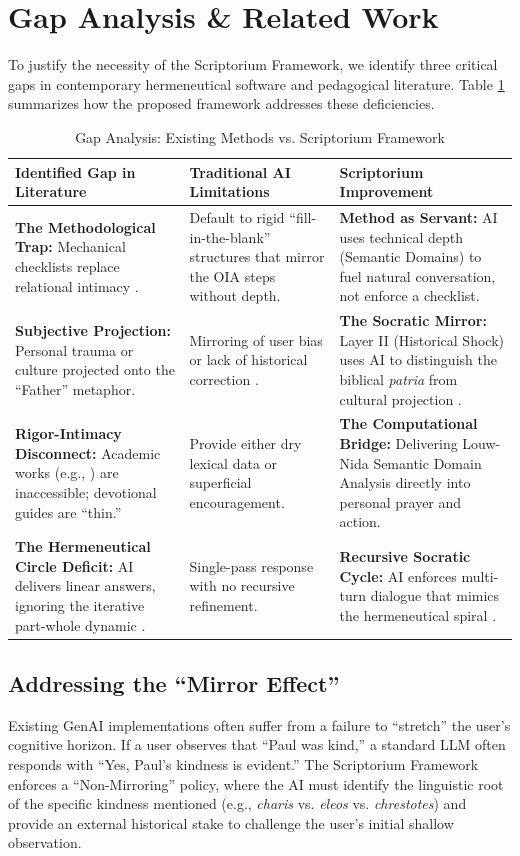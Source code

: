 \section{Gap Analysis \& Related Work}
To justify the necessity of the Scriptorium Framework, we identify three critical gaps in contemporary hermeneutical software and pedagogical literature. Table \ref{tab:gaps} summarizes how the proposed framework addresses these deficiencies.

\begin{table}[t]
\caption{Gap Analysis: Existing Methods vs. Scriptorium Framework}
\label{tab:gaps}
\centering
\begin{tabular}{@{}p{}p{}p{}@{}}
\toprule
\textbf{Identified Gap in Literature} & \textbf{Traditional AI Limitations} & \textbf{Scriptorium Improvement} \\ \midrule
\textbf{The Methodological Trap:} Mechanical checklists replace relational intimacy \cite{traina1952}. & Default to rigid ``fill-in-the-blank'' structures that mirror the OIA steps without depth. & \textbf{Method as Servant:} AI uses technical depth (Semantic Domains) to fuel natural conversation, not enforce a checklist. \\ \midrule
\textbf{Subjective Projection:} Personal trauma or culture projected onto the ``Father'' metaphor. & Mirroring of user bias or lack of historical correction \cite{bender2021parrots}. & \textbf{The Socratic Mirror:} Layer II (Historical Shock) uses AI to distinguish the biblical \textit{patria} from cultural projection \cite{malina2001}. \\ \midrule
\textbf{Rigor-Intimacy Disconnect:} Academic works (e.g., \cite{osborne2006}) are inaccessible; devotional guides are ``thin.'' & Provide either dry lexical data or superficial encouragement. & \textbf{The Computational Bridge:} Delivering Louw-Nida \cite{louwnida1988} Semantic Domain Analysis directly into personal prayer and action. \\ \midrule
\textbf{The Hermeneutical Circle Deficit:} AI delivers linear answers, ignoring the iterative part-whole dynamic \cite{gadamer1960}. & Single-pass response with no recursive refinement. & \textbf{Recursive Socratic Cycle:} AI enforces multi-turn dialogue that mimics the hermeneutical spiral \cite{osborne2006}. \\ \bottomrule
\end{tabular}
\end{table}

\subsection{Addressing the ``Mirror Effect''}
Existing GenAI implementations often suffer from a failure to ``stretch'' the user's cognitive horizon. If a user observes that ``Paul was kind,'' a standard LLM often responds with ``Yes, Paul's kindness is evident.'' The Scriptorium Framework enforces a ``Non-Mirroring'' policy, where the AI must identify the linguistic root of the specific kindness mentioned (e.g., \textit{charis} vs. \textit{eleos} vs. \textit{chrestotes}) and provide an external historical stake to challenge the user's initial shallow observation.

